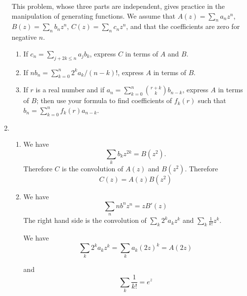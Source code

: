 \documentclass[12pt,a4paper]{article}
\makeatletter
\newtheorem*{solution}{Solution}
\theoremstyle{definition}
\renewenvironment{solution}[1][Solution] {\par\pushQED{\qed}\normalfont\topsep6\p@\@plus6\p@\relax\trivlist\item[\hskip\labelsep\bfseries#1\@addpunct{.}]\ignorespaces}{\popQED\endtrivlist\@endpefalse} \makeatother
\makeatother
\begin{document}
\begin{enumerate}
        This problem, whose three parts are independent, gives practice in the manipulation of generating functions. We assume that $A(z)=\sum_n a_nz^n$, $B(z)=\sum_n b_nz^n$, $C(z)=\sum_n c_nz^n$, and that the coefficients are zero for negative $n$.
        \begin{enumerate}
        	\item 
        	    If $c_n=\sum_{j+2k\le n} a_jb_k$, express $C$ in terms of $A$ and $B$.
        	\item 
        	    If $nb_n=\sum_{k=0}^{n}2^ka_k/(n-k)!$, express $A$ in terms of $B$.
        	\item 
        	    If $r$ is a real number and if $a_n=\sum_{k=0}^{n}\binom{r+k}{k}b_{n-k}$, express $A$ in terms of $B$; then use your formula to find coefficients of $f_k(r)$ such that $b_n=\sum_{k=0}^{n}f_k(r)a_{n-k}$.
        \end{enumerate}
        \begin{solution}
        	\begin{enumerate}
        		\item 
        		    We have
        		    \begin{equation*}
        		        \sum_k b_kz^{2k}=B(z^2).
        		    \end{equation*}
        		    Therefore $C$ is the convolution of $A(z)$ and $B(z^2)$.
        		    Therefore
        		    \begin{equation*}
        		        C(z)=A(z)B(z^2)
        		    \end{equation*}
        		\item 
        		    We have
        		    \begin{equation*}
        		        \sum_n nb^nz^n=zB'(z)
        		    \end{equation*}
        		    The right hand side is the convolution of $\sum_k 2^ka_kz^k$ and $\sum_k \frac{1}{k!}z^k$.
        		    
        		    We have
        		    \begin{equation*}
        		        \sum_k 2^ka_kz^k=\sum_k a_k(2z)^k=A(2z)
        		    \end{equation*}
        		    
        		    and
        		    \begin{equation*}
        		        \sum_k \frac{1}{k!}=e^z
        		    \end{equation*}
        		    

\end{enumerate}
\end{solution}
\end{enumerate}
\end{document}
